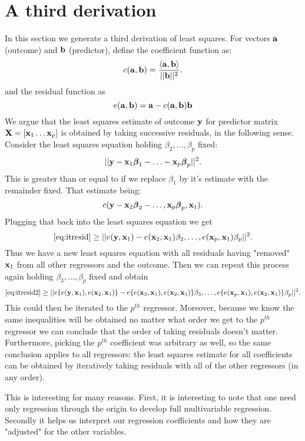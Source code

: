 \section{A third derivation}
In this section we generate a third derivation
of least squares. 
For vectors $\mathbf{a}$ (outcome) and $\mathbf{b}$ (predictor), define the coefficient function as:
$$
c(\mathbf{a}, \mathbf{b})
= \frac{\langle \mathbf{a}, \mathbf{b} \rangle}{|| \mathbf{b} ||^2}.
$$
and the residual function as
$$
e(\mathbf{a}, \mathbf{b}) = \mathbf{a} - c(\mathbf{a}, \mathbf{b}) \mathbf{b}
$$
We argue that the least squares estimate of outcome
$\mathbf{y}$ for predictor matrix $\mathbf{X} = [\mathbf{x}_1 \ldots \mathbf{x}_p]$
is obtained by taking successive residuals, in the following sense. Consider the least squares
equation holding $\beta_2, \ldots, \beta_p$ fixed:
\begin{equation}
\label{eq:itresid}
|| \mathbf{y} - \mathbf{x}_1 \boldsymbol{\beta}_1 - \ldots - \mathbf{x}_p \boldsymbol{\beta}_p||^2.
\end{equation}
This is greater than or equal to
if we replace $\beta_1$ by it's
estimate with the remainder fixed. That estimate
being:
$$
c(\mathbf{y} - \mathbf{x}_2 \boldsymbol{\beta}_2 - \ldots, \mathbf{x}_p \boldsymbol{\beta}_p, \mathbf{x}_1).
$$
Plugging that back into the least squares equation we
get
\begin{equation}
\label{eq:itresid2}
\eqref{eq:itresid}\geq ||e(\mathbf{y}, \mathbf{x}_1) - 
e(\mathbf{x}_2, \mathbf{x}_1) \beta_2, \ldots, e(\mathbf{x}_p, \mathbf{x}_1) \beta_p||^2.
\end{equation}
Thus we have a new least squares equation with 
all residuals having "removed" $\mathbf{x}_1$ from all other
regressors and the outcome. Then we can repeat this
process again holding $\beta_3, \ldots, \beta_p$
fixed and obtain
$$
\eqref{eq:itresid2}\geq ||e\{e(\mathbf{y}, \mathbf{x}_1), e(\mathbf{x}_2, \mathbf{x}_1)\} - 
e\{e(\mathbf{x}_3, \mathbf{x}_1), e(\mathbf{x}_2, \mathbf{x}_1)\} \beta_3, \ldots, e\{e(\mathbf{x}_p, \mathbf{x}_1), e(\mathbf{x}_{2}, \mathbf{x}_1)\} \beta_p||^2.
$$
This could then be iterated to the $p^{th}$ regressor.
Moreover, because we know the same inequalities will be
obtained no matter what order we get to the $p^{th}$
regressor we can conclude that the order of taking
residuals doesn't matter. Furthermore, picking the
$p^{th}$ coefficient was arbitrary as well, so the
same conclusion applies to all regressors: the
least squares estimate for all coefficients can be
obtained by iteratively taking residuals with all of the
other regressors (in any order). 

This is interesting for many reasons. First, it
is interesting to note that one need only 
regression through the origin to develop full
multivariable regression. Secondly it helps
us interpret our regression coefficients and
how they are "adjusted" for the other variables.

